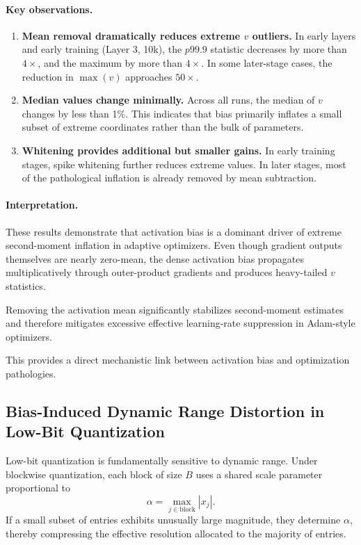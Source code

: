 \paragraph{Key observations.}

\begin{enumerate}
\item \textbf{Mean removal dramatically reduces extreme $v$ outliers.}
In early layers and early training (Layer 3, 10k), the $p99.9$
statistic decreases by more than $4\times$, and the maximum by more
than $4\times$.
In some later-stage cases, the reduction in $\max(v)$ approaches
$50\times$.

\item \textbf{Median values change minimally.}
Across all runs, the median of $v$ changes by less than 1\%.
This indicates that bias primarily inflates a small subset of
extreme coordinates rather than the bulk of parameters.

\item \textbf{Whitening provides additional but smaller gains.}
In early training stages, spike whitening further reduces extreme
values.
In later stages, most of the pathological inflation is already
removed by mean subtraction.
\end{enumerate}

\paragraph{Interpretation.}

These results demonstrate that activation bias is a dominant driver
of extreme second-moment inflation in adaptive optimizers.
Even though gradient outputs themselves are nearly zero-mean,
the dense activation bias propagates multiplicatively through
outer-product gradients and produces heavy-tailed $v$ statistics.

Removing the activation mean significantly stabilizes second-moment
estimates and therefore mitigates excessive effective learning-rate
suppression in Adam-style optimizers.

This provides a direct mechanistic link between activation bias
and optimization pathologies.


\subsection{Bias-Induced Dynamic Range Distortion in Low-Bit Quantization}
\label{subsec:quant_bias}

Low-bit quantization is fundamentally sensitive to dynamic range.
Under blockwise quantization, each block of size $B$ uses a shared
scale parameter proportional to
\[
\alpha = \max_{j \in \text{block}} |x_j|.
\]
If a small subset of entries exhibits unusually large magnitude,
they determine $\alpha$, thereby compressing the effective resolution
allocated to the majority of entries.

